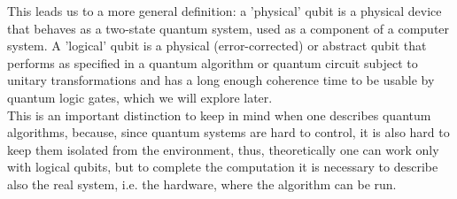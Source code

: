 This leads us to a more general definition: a 'physical' qubit is a physical device that behaves as a two-state quantum system, used as a component of a computer system. A 'logical' qubit is a physical (error-corrected) or abstract qubit that performs as specified in a quantum algorithm or quantum circuit subject to unitary transformations and has a long enough coherence time to be usable by quantum logic gates, which we will explore later. \\
This is an important distinction to keep in mind when one describes quantum algorithms, because, since quantum systems are hard to control, it is also hard to keep them isolated from the environment, thus, theoretically one can work only with logical qubits, but to complete the computation it is necessary to describe also the real system, i.e. the hardware, where the algorithm can be run.

